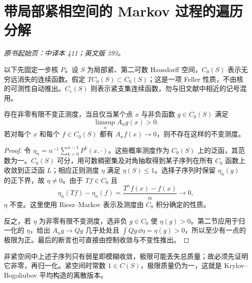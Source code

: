 \section{带局部紧相空间的 Markov 过程的遍历分解}\label{sec:yosida-13-04}
\noindent\textit{原书起始页：中译本 411；英文版 393。}

以下先固定一步核 $P$。设 $S$ 为局部紧、第二可数 Hausdorff 空间，$C_0(S)$ 表示无穷远消失的连续函数。假定 $T C_0(S)\subset C_0(S)$；这是一项 Feller 性质，不由核的可测性自动推出。$C_c(S)$ 则表示紧支集连续函数，勿与旧文献中相近的记号混用。

\begin{theorem}[不变测度与不逃逸的平均质量]\label{thm:y13-invariant-existence}
存在非零有限不变正测度，当且仅当某个点 $x$ 与非负函数 $g\in C_0(S)$ 满足
\[
 \limsup_n A_ng(x)>0.
\]
若对每个 $x$ 和每个 $f\in C_0(S)$ 都有 $A_nf(x)\to0$，则不存在这样的不变测度。
\end{theorem}
\begin{proof}
令 $\eta_n=n^{-1}\sum_{k=0}^{n-1}P^k(x,\cdot)$。这些概率测度作为 $C_0(S)$ 上的泛函，其范数为一。$C_0(S)$ 可分，用可数稠密集及对角抽取得到某子序列在所有 $C_0$ 函数上收敛到正泛函 $L$；相应正则测度 $\eta$ 满足 $\eta(S)\le1$。选择子序列时保留 $\eta_n(g)$ 的正下界，故 $\eta\ne0$。由于 $Tf\in C_0$ 且
\[
 \eta_n(Tf)-\eta_n(f)=\frac{T^nf(x)-f(x)}n\longrightarrow0,
\]
$\eta$ 不变。这里使用 Riesz--Markov 表示及测度由 $C_0$ 积分确定的性质。

反之，若 $\eta$ 为非零有限不变测度，选非负 $g\in C_0$ 使 $\eta(g)>0$。第二节应用于归一化的 $\eta$，给出 $A_ng\to Qg$ 几乎处处且 $\int Qg\,\dd\eta=\eta(g)>0$，所以至少有一点的极限为正。最后的断言也可直接由控制收敛与不变性推出。
\end{proof}

非紧空间中上述子序列只有弱星即模糊收敛，极限可能丢失总质量；故必须先证明它非零，再归一化。紧空间时常数 $1\in C(S)$，极限质量仍为一，这就是 Krylov--Bogoliubov 平均构造的离散版本。

